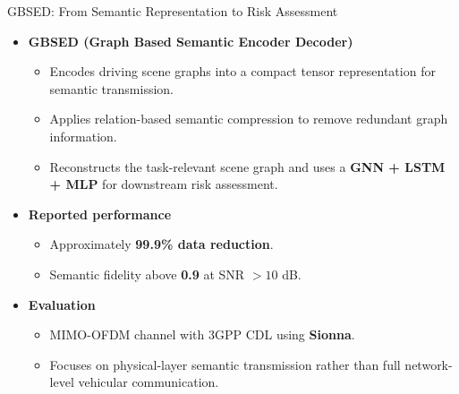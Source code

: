 \documentclass[aspectratio=169]{beamer}
\begin{document}
\begin{frame}{GBSED: From Semantic Representation to Risk Assessment}

\begin{itemize}

    \item \textbf{GBSED (Graph Based Semantic Encoder Decoder) \cite{ribouh2026gbsed}}
    \begin{itemize}
        \item Encodes driving scene graphs into a compact tensor
        representation for semantic transmission.
        \item Applies relation-based semantic compression to remove
        redundant graph information.
        \item Reconstructs the task-relevant scene graph and uses a
        \textbf{GNN + LSTM + MLP} for downstream risk assessment.
    \end{itemize}

    \vspace{0.15cm}

    \item \textbf{Reported performance}
    \begin{itemize}
        \item Approximately \textbf{99.9\% data reduction}.
        \item Semantic fidelity above \textbf{0.9} at SNR $>10$ dB.
    \end{itemize}

    \vspace{0.15cm}

    \item \textbf{Evaluation}
    \begin{itemize}
        \item MIMO-OFDM channel with 3GPP CDL using \textbf{Sionna}.
        \item Focuses on physical-layer semantic transmission rather than
        full network-level vehicular communication.
    \end{itemize}

\end{itemize}

\end{frame}
\end{document}
